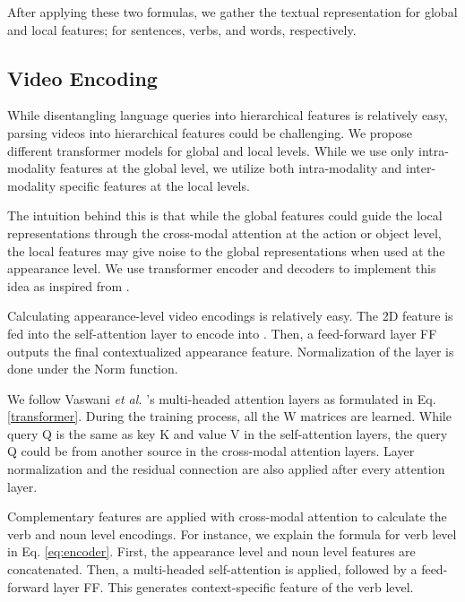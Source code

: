 \documentclass[lettersize,journal]{IEEEtran}
\begin{document}
After applying these two formulas, we gather the textual representation for global and local features; for sentences, verbs, and words, respectively.

\subsection{Video Encoding}

While disentangling language queries into hierarchical features is relatively easy, parsing videos into hierarchical features could be challenging. We propose different transformer models for global and local levels. While we use only intra-modality features at the global level, we utilize both intra-modality and inter-modality specific features at the local levels. 

The intuition behind this is that while the global features could guide the local representations through the cross-modal attention at the action or object level, the local features may give noise to the global representations when used at the appearance level. We use transformer encoder and decoders to implement this idea as inspired from \cite{NIPS2017_3f5ee243,gabeur2020mmt, devlin-etal-2019-bert, MDVC_Iashin_2020}.

Calculating appearance-level video encodings is relatively easy. The 2D feature  is fed into the self-attention layer to encode into . Then, a feed-forward layer FF outputs the final contextualized appearance feature. Normalization of the layer is done under the Norm function.



We follow Vaswani \textit{et al.} \cite{NIPS2017_3f5ee243}'s multi-headed attention layers as formulated in Eq. \ref{transformer}. During the training process, all the W matrices are learned. While query Q is the same as key K and value V in the self-attention layers, the query Q could be from another source in the cross-modal attention layers. Layer normalization and the residual connection are also applied after every attention layer. 



Complementary features are applied with cross-modal attention to calculate the verb  and noun  level encodings. For instance, we explain the formula for verb level in Eq. \ref{eq:encoder}. First, the appearance level  and noun level features  are concatenated. Then, a multi-headed self-attention is applied, followed by a feed-forward layer FF. This generates context-specific feature  of the verb level.
\end{document}
